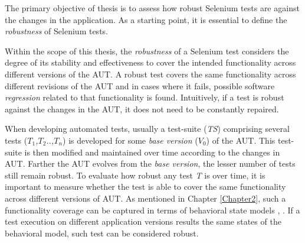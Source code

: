The primary objective of thesis is to assess how robust Selenium tests are against the changes in the application. As a starting point, it is essential to define the \textit{robustness} of Selenium tests. 

Within the scope of this thesis, the \textit{robustness} of a Selenium test considers the degree of its stability and effectiveness to cover the intended functionality across different versions of the AUT. A robust test covers the same functionality across different revisions of the AUT and in cases where it fails, possible software \textit{regression} related to that functionality is found. Intuitively, if a test is robust against the changes in the AUT, it does not need to be constantly repaired.



  


When developing automated tests, usually a test-suite (\textit{TS}) comprising several tests (\textit{$T_1$,$T_2$..,$T_n$}) is developed for some \textit{base version} (\textit{$V_{0}$}) of the AUT. This test-suite is then modified and maintained over time according to the changes in AUT. Farther the AUT evolves from the \textit{base version}, the lesser number of tests still remain robust. To evaluate how robust any test \textit{T} is over time, it is important to measure whether the test is able to cover the same functionality across different versions of AUT. As mentioned in Chapter \ref{Chapter2}, such a functionality coverage can be captured in terms of behavioral state models \cite{marchettoStateBased}, \cite{SchurMiningBehavModels}. If a test execution on different application versions results the same states of the behavioral model, such test can be considered robust.

